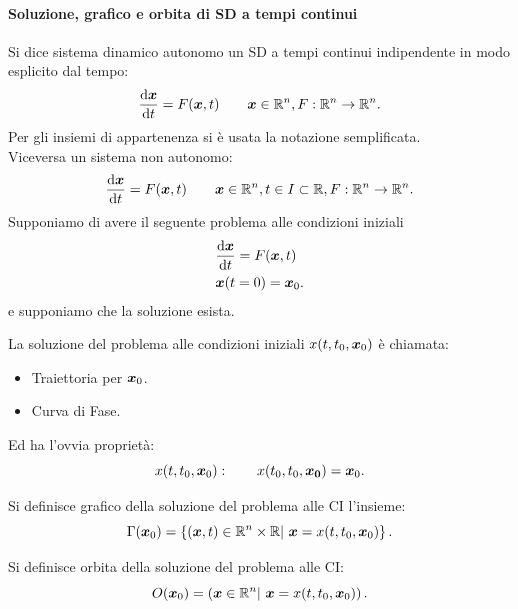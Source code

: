 \paragraph{Soluzione, grafico e orbita di SD a tempi continui}%
\label{par:Soluzione, grafico e orbita di SD a tempi continui}
Si dice sistema dinamico autonomo un SD a tempi continui indipendente in modo esplicito dal tempo:
\[
    \frac{\text{d} \boldsymbol{x}}{\text{d} t} = F(\boldsymbol{x}, t) \qquad \boldsymbol{x}\in \mathbb{R}^n, F:\mathbb{R}^n\to \mathbb{R}^n
.\] 
Per gli insiemi di appartenenza si è usata la notazione semplificata.\\
Viceversa un sistema non autonomo:
\[
    \frac{\text{d} \boldsymbol{x}}{\text{d} t} =F(\boldsymbol{x}, t) \qquad 
    \boldsymbol{x}\in \mathbb{R}^n, t \in I \subset \mathbb{R}, F:\mathbb{R}^n\to \mathbb{R}^n
.\] 
Supponiamo di avere il seguente problema alle condizioni iniziali
\[\begin{aligned}
    & \frac{\text{d} \boldsymbol{x}}{\text{d} t} = F(\boldsymbol{x} ,t)\\
    & \boldsymbol{x} (t=0) = \boldsymbol{x}_0
.\end{aligned}\]
e supponiamo che la soluzione esista.
\begin{defn}
    La soluzione del problema alle condizioni iniziali $x (t, t_0, \boldsymbol{x}_0)$ è chiamata:
    \begin{itemize}
        \item Traiettoria per $\boldsymbol{x}_0$.
	\item Curva di Fase.
    \end{itemize}
    Ed ha l'ovvia proprietà:
    \[
	x(t, t_0, \boldsymbol{x}_0): \qquad x (t_0, t_0, \boldsymbol{x_0}) = \boldsymbol{x}_0
    .\] 
\end{defn}
\noindent
\begin{defn}[Grafico]
    Si definisce grafico della soluzione del problema alle CI l'insieme:
    \[
	\Gamma (\boldsymbol{x}_0) = \left\{(\boldsymbol{x}, t) \in \mathbb{R}^n \times \mathbb{R} | \ \boldsymbol{x}  = x(t, t_0, \boldsymbol{x}_0)\right\}
    .\] 
\end{defn}
\noindent
\begin{defn}[Orbita]
    Si definisce orbita della soluzione del problema alle CI:
    \[
	O(\boldsymbol{x}_0) = \left(\boldsymbol{x}\in \mathbb{R}^n | \ \boldsymbol{x}  = x(t, t_0, \boldsymbol{x}_0)\right)
    .\] 
\end{defn}
\noindent

